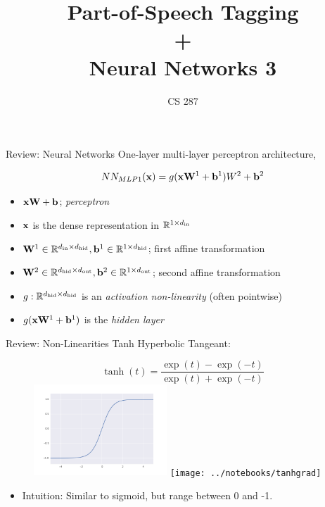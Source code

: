 \documentclass{beamer}
\title{Part-of-Speech Tagging \\ + \\ Neural Networks 3 }  }
\date{}
\author{CS 287}
\begin{document}
\begin{frame}
  \titlepage
\end{frame}


\begin{frame}{Review: Neural Networks}
  One-layer multi-layer perceptron architecture,

  \[NN_{MLP1}(\mathbf{x}) =  g(\mathbf{x}\mathbf{W}^1 + \mathbf{b}^1)W^2 + \mathbf{b}^2\]
  \begin{itemize}
  \item $\mathbf{x}\mathbf{W} + \mathbf{b}$; \textit{perceptron}
  \item $\mathbf{x}$ is the dense representation in $\mathbb{R}^{1 \times {d_{\mathrm{in}}}}$
  \item $\mathbf{W}^1 \in \mathbb{R}^{{d_{\mathrm{in}}} \times {d_{\mathrm{hid}}}}, \mathbf{b}^1 \in \mathbb{R}^{1 \times {d_{\mathrm{hid}}}}$; first affine transformation
  \item $\mathbf{W}^2 \in \mathbb{R}^{{d_{\mathrm{hid}}} \times {d_{\mathrm{out}}}}, \mathbf{b}^2 \in \mathbb{R}^{1 \times {d_{\mathrm{out}}}}$; second affine transformation
  \item $g:\mathbb{R}^{{d_{\mathrm{hid}}} \times {d_{\mathrm{hid}}}}$ is an \textit{activation non-linearity} (often pointwise)
  \item $g(\mathbf{x}\mathbf{W}^1 + \mathbf{b}^1)$ is the \textit{hidden layer}
  \end{itemize}
\end{frame}

\begin{frame}{Review: Non-Linearities Tanh}
  Hyperbolic Tangeant:
  \begin{figure}
    \centering
    \[\tanh(t) = \frac{\exp(t) - \exp(-t)}{\exp(t) + \exp(-t)}  \]
    \includegraphics[width=5cm]{../notebooks/tanh}
    \texttt{[image: ../notebooks/tanhgrad]}
  \end{figure}
  \begin{itemize}
  \item Intuition: Similar to sigmoid, but range between 0 and -1.
  \end{itemize}
\end{frame}
\end{document}
